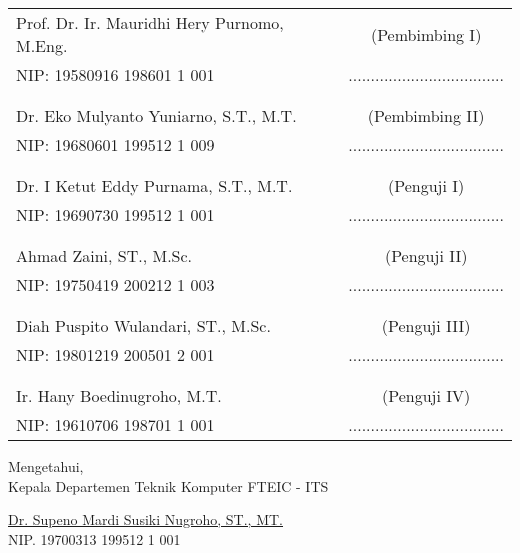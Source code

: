     \noindent
    \begin{tabularx}{\textwidth}{X c}
      Prof. Dr. Ir. Mauridhi Hery Purnomo, M.Eng.          & (Pembimbing I) \\
      NIP: 	19580916 198601 1 001       & ................................... \\
      &  \\
      &  \\
      Dr. Eko Mulyanto Yuniarno, S.T., M.T.     & (Pembimbing II) \\
      NIP: 19680601 199512 1 009        & ................................... \\
      &  \\
      &  \\
      	Dr. I Ketut Eddy Purnama, S.T., M.T.  & (Penguji I) \\
      NIP: 19690730 199512 1 001        & ................................... \\
      &  \\
      &  \\
      Ahmad Zaini, ST., M.Sc.  & (Penguji II) \\
      NIP: 19750419 200212 1 003        & ................................... \\
      &  \\
      &  \\
      Diah Puspito Wulandari, ST., M.Sc.             & (Penguji III) \\
      NIP: 19801219 200501 2 001        & ................................... \\
      &  \\
      &  \\
      Ir. Hany Boedinugroho, M.T.             & (Penguji IV) \\
      NIP: 19610706 198701 1 001        & ................................... \\
    \end{tabularx}
  \endgroup

  \vspace{1ex}

  \begin{center}
    Mengetahui, \\
    Kepala Departemen Teknik Komputer FTEIC - ITS \\

    \vspace{7ex}

    \underline{Dr. Supeno Mardi Susiki Nugroho, ST., MT.} \\
    NIP. 19700313 199512 1 001
  \end{center}
\endgroup
